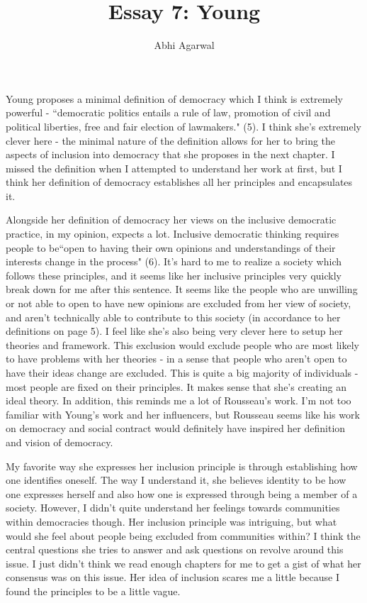\documentclass[11pt, oneside]{article}
\title{Essay 7: Young}
\author{Abhi Agarwal}
\date{}
\begin{document}
\maketitle

\par Young proposes a minimal definition of democracy which I think is extremely powerful - ``democratic politics entails a rule of law, promotion of civil and political liberties, free and fair election of lawmakers." (5). I think she's extremely clever here - the minimal nature of the definition allows for her to bring the aspects of inclusion into democracy that she proposes in the next chapter. I missed the definition when I attempted to understand her work at first, but I think her definition of democracy establishes all her principles and encapsulates it. 

\par Alongside her definition of democracy her views on the inclusive democratic practice, in my opinion, expects a lot. Inclusive democratic thinking requires people to be``open to having their own opinions and understandings of their interests change in the process" (6). It's hard to me to realize a society which follows these principles, and it seems like her inclusive principles very quickly break down for me after this sentence. It seems like the people who are unwilling or not able to open to have new opinions are excluded from her view of society, and aren't technically able to contribute to this society (in accordance to her definitions on page 5). I feel like she's also being very clever here to setup her theories and framework. This exclusion would exclude people who are most likely to have problems with her theories - in a sense that people who aren't open to have their ideas change are excluded. This is quite a big majority of individuals - most people are fixed on their principles. It makes sense that she's creating an ideal theory. In addition, this reminds me a lot of Rousseau's work. I'm not too familiar with Young's work and her influencers, but Rousseau seems like his work on democracy and social contract would definitely have inspired her definition and vision of democracy. 

\par My favorite way she expresses her inclusion principle is through establishing how one identifies oneself. The way I understand it, she believes identity to be how one expresses herself and also how one is expressed through being a member of a society. However, I didn't quite understand her feelings towards communities within democracies though. Her inclusion principle was intriguing, but what would she feel about people being excluded from communities within? I think the central questions she tries to answer and ask questions on revolve around this issue. I just didn't think we read enough chapters for me to get a gist of what her consensus was on this issue. Her idea of inclusion scares me a little because I found the principles to be a little vague. 
\end{document}
